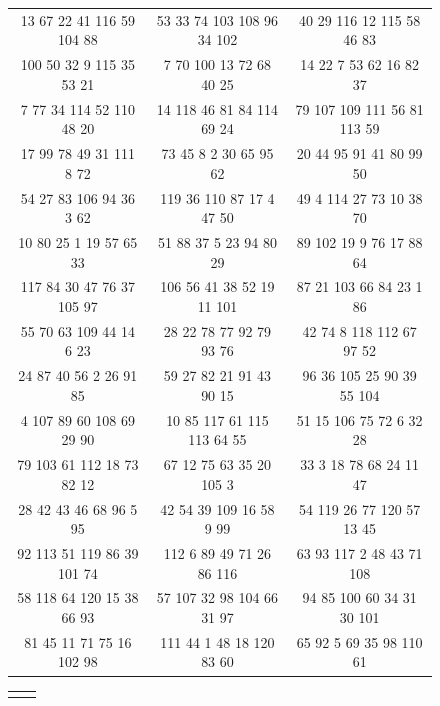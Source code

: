 \begin{figure}[h!]
\centering %
\begin{tabular}{|c | c |c |} %
\hline %
13	67	22	41	116	59	104	88&	53	33	74	103	108	96	34	102&40	29	116	12	115	58	46	83\\
100	50	32	9	115	35	53	21&	7	70	100	13	72	68	40	25&	14	22	7	53	62	16	82	37\\
7	77	34	114	52	110	48	20&	14	118	46	81	84	114	69	24&	79	107	109	111	56	81	113	59\\
17	99	78	49	31	111	8	72&	73	45	8	2	30	65	95	62&	20	44	95	91	41	80	99	50\\
54	27	83	106	94	36	3	62&	119	36	110	87	17	4	47	50&	49	4	114	27	73	10	38	70\\
10	80	25	1	19	57	65	33&	51	88	37	5	23	94	80	29&	89	102	19	9	76	17	88	64\\
117	84	30	47	76	37	105	97&	106	56	41	38	52	19	11	101&87	21	103	66	84	23	1	86\\
55	70	63	109	44	14	6	23&	28	22	78	77	92	79	93	76&	42	74	8	118	112	67	97	52\\
24	87	40	56	2	26	91	85&	59	27	82	21	91	43	90	15&	96	36	105	25	90	39	55	104\\
4	107	89	60	108	69	29	90&	10	85	117	61	115	113	64	55&	51	15	106	75	72	6	32	28\\
79	103	61	112	18	73	82	12&	67	12	75	63	35	20	105	3&	33	3	18	78	68	24	11	47\\
28	42	43	46	68	96	5	95&	42	54	39	109	16	58	9	99&	54	119	26	77	120	57	13	45\\
92	113	51	119	86	39	101	74&	112	6	89	49	71	26	86	116&63	93	117	2	48	43	71	108\\
58	118	64	120	15	38	66	93&	57	107	32	98	104	66	31	97&	94	85	100	60	34	31	30	101\\
81	45	11	71	75	16	102	98&	111	44	1	48	18	120	83	60&	65	92	5	69	35	98	110	61\\

\hline
\end{tabular}

\centering
\begin{tabular}{c c }
  & \\
\end{tabular}


\end{figure}
